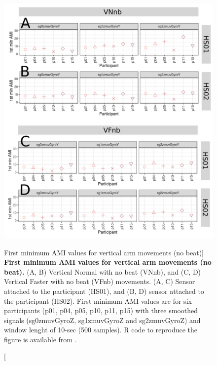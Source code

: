 \begin{figure}
\centering
\includegraphics[width=1.0\textwidth]{ami_Vnb_w10}
	\caption
	[First minimum AMI values for vertical arm movements (no beat)]{
	{\bf First minimum AMI values for vertical arm movements (no beat).}
		(A, B) Vertical Normal with no beat (VNnb), and 
		(C, D) Vertical Faster with no beat (VFnb) movements.
		(A, C) Sensor attached to the participant (HS01), and
		(B, D) sensor attached to the participant (HS02).
		First minimum AMI values are for six participants 
		(p01, p04, p05, p10, p11, p15) with three smoothed 
		signals (sg0zmuvGyroZ, sg1zmuvGyroZ and sg2zmuvGyroZ) and 
		window lenght of 10-sec (500 samples).
		R code to reproduce the figure is available 
		from \cite{hwum2018}.
        }
    \label{fig:amiVnb}
\end{figure}

